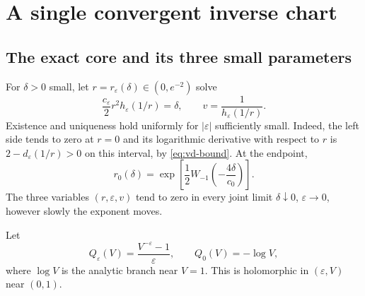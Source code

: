 \documentclass[11pt,a4paper]{article}
\numberwithin{equation}{section}
\theoremstyle{definition}
\theoremstyle{remark}
\newcommand{\eps}{\varepsilon}
\begin{document}
\section{A single convergent inverse chart}
\label{sec:chart}

\subsection{The exact core and its three small parameters}
For \(\delta>0\) small, let \(r=r_\eps(\delta)\in(0,e^{-2})\) solve
\begin{equation}
 \frac{c_\eps}{2}r^2h_\eps(1/r)=\delta,
 \qquad v=\frac1{h_\eps(1/r)}.
 \label{eq:core}
\end{equation}
Existence and uniqueness hold uniformly for \(|\eps|\) sufficiently small.
Indeed, the left side tends to zero at \(r=0\) and its logarithmic derivative
with respect to \(r\) is \(2-d_\eps(1/r)>0\) on this interval, by
\eqref{eq:vd-bound}. At the endpoint,
\begin{equation}
 r_0(\delta)=\exp\left[\frac12W_{-1}\left(-\frac{4\delta}{c_0}\right)\right].
 \label{eq:lambert-core}
\end{equation}
The three variables \((r,\eps,v)\) tend to zero in every joint limit
\(\delta\downarrow0\), \(\eps\to0\), however slowly the exponent moves.

Let
\begin{equation}
 Q_\eps(V)=\frac{V^{-\eps}-1}{\eps},\qquad Q_0(V)=-\log V,
 \label{eq:Q}
\end{equation}
where \(\log V\) is the analytic branch near \(V=1\). This is holomorphic
in \((\eps,V)\) near \((0,1)\).
\end{document}
